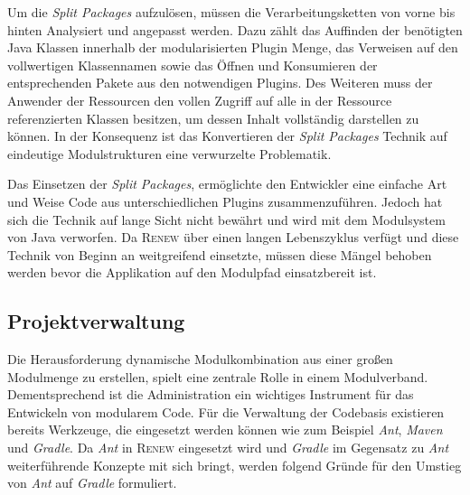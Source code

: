 		Um die \textit{Split Packages} aufzulösen, müssen die Verarbeitungsketten von vorne bis hinten Analysiert und angepasst werden. Dazu zählt das Auffinden der benötigten Java Klassen innerhalb der modularisierten Plugin Menge, das Verweisen auf den vollwertigen Klassennamen sowie das Öffnen und Konsumieren der entsprechenden Pakete aus den notwendigen Plugins. Des Weiteren muss der Anwender der Ressourcen den vollen Zugriff auf alle in der Ressource referenzierten Klassen besitzen, um dessen Inhalt vollständig darstellen zu können. In der Konsequenz ist das Konvertieren der \textit{Split Packages} Technik auf eindeutige Modulstrukturen eine verwurzelte Problematik. \bigbreak

		Das Einsetzen der \textit{Split Packages}, ermöglichte den Entwickler eine einfache Art und Weise Code aus unterschiedlichen Plugins zusammenzuführen. Jedoch hat sich die Technik auf lange Sicht nicht bewährt und wird mit dem Modulsystem von Java verworfen. Da \textsc{Renew} über einen langen Lebenszyklus verfügt und diese Technik von Beginn an weitgreifend einsetzte, müssen diese Mängel behoben werden bevor die Applikation auf den Modulpfad einsatzbereit ist. 

	\subsection{Projektverwaltung} \label{sub:projekt_verwaltung} %
		Die Herausforderung dynamische Modulkombination aus einer großen Modulmenge zu erstellen, spielt eine zentrale Rolle in einem Modulverband. Dementsprechend ist die Administration ein wichtiges Instrument für das Entwickeln von modularem Code.\newline
		Für die Verwaltung der Codebasis existieren bereits Werkzeuge, die eingesetzt werden können wie zum Beispiel \textit{Ant}, \textit{Maven} und \textit{Gradle}. Da \textit{Ant} in \textsc{Renew} eingesetzt wird und \textit{Gradle} im Gegensatz zu \textit{Ant} weiterführende Konzepte mit sich bringt, werden  folgend Gründe für den Umstieg von \textit{Ant} auf \textit{Gradle} formuliert.
	
